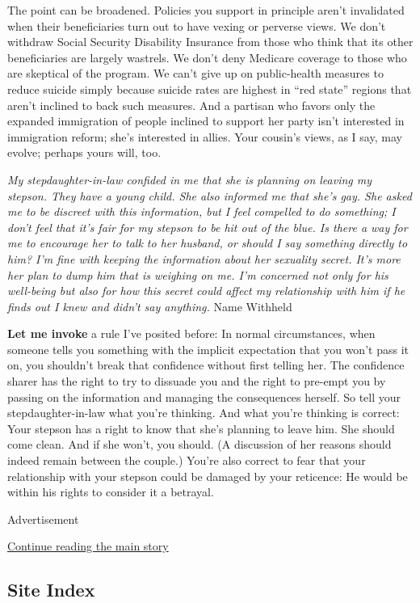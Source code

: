 The point can be broadened. Policies you support in principle aren't
invalidated when their beneficiaries turn out to have vexing or perverse
views. We don't withdraw Social Security Disability Insurance from those
who think that its other beneficiaries are largely wastrels. We don't
deny Medicare coverage to those who are skeptical of the program. We
can't give up on public-health measures to reduce suicide simply because
suicide rates are highest in ``red state'' regions that aren't inclined
to back such measures. And a partisan who favors only the expanded
immigration of people inclined to support her party isn't interested in
immigration reform; she's interested in allies. Your cousin's views, as
I say, may evolve; perhaps yours will, too.

\emph{My stepdaughter-in-law confided in me that she is planning on
leaving my stepson. They have a young child. She also informed me that
she's gay. She asked me to be discreet with this information, but I feel
compelled to do something; I don't feel that it's fair for my stepson to
be hit out of the blue. Is there a way for me to encourage her to talk
to her husband, or should I say something directly to him? I'm fine with
keeping the information about her sexuality secret. It's more her plan
to dump him that is weighing on me. I'm concerned not only for his
well-being but also for how this secret could affect my relationship
with him if he finds out I knew and didn't say anything.} Name Withheld

\textbf{Let me invoke} a rule I've posited before: In normal
circumstances, when someone tells you something with the implicit
expectation that you won't pass it on, you shouldn't break that
confidence without first telling her. The confidence sharer has the
right to try to dissuade you and the right to pre-empt you by passing on
the information and managing the consequences herself. So tell your
stepdaughter-in-law what you're thinking. And what you're thinking is
correct: Your stepson has a right to know that she's planning to leave
him. She should come clean. And if she won't, you should. (A discussion
of her reasons should indeed remain between the couple.) You're also
correct to fear that your relationship with your stepson could be
damaged by your reticence: He would be within his rights to consider it
a betrayal.

Advertisement

\protect\hyperlink{after-bottom}{Continue reading the main story}

\hypertarget{site-index}{%
\subsection{Site Index}\label{site-index}}

